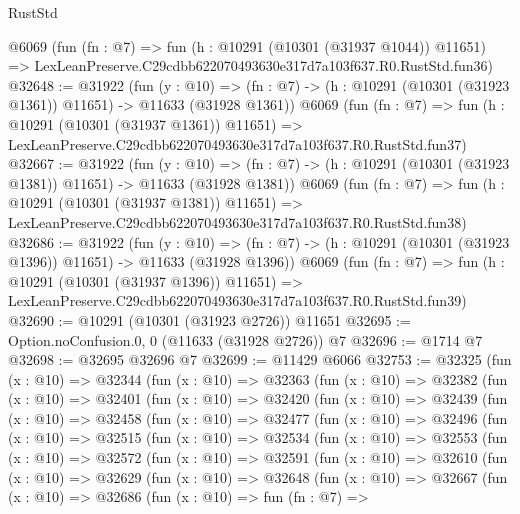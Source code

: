 \begin{lexlean}{RustStd}
\begin{coremodule}
    @6069
    (fun (fn : @7) =>
    fun (h : @10291 (@10301 (@31937 @1044)) @11651) =>
    LexLeanPreserve.C29cdbb622070493630e317d7a103f637.R0.RustStd.fun36)
@32648 := @31922
    (fun (y : @10) =>
    (fn : @7) -> (h : @10291 (@10301 (@31923 @1361)) @11651) -> @11633 (@31928 @1361))
    @6069
    (fun (fn : @7) =>
    fun (h : @10291 (@10301 (@31937 @1361)) @11651) =>
    LexLeanPreserve.C29cdbb622070493630e317d7a103f637.R0.RustStd.fun37)
@32667 := @31922
    (fun (y : @10) =>
    (fn : @7) -> (h : @10291 (@10301 (@31923 @1381)) @11651) -> @11633 (@31928 @1381))
    @6069
    (fun (fn : @7) =>
    fun (h : @10291 (@10301 (@31937 @1381)) @11651) =>
    LexLeanPreserve.C29cdbb622070493630e317d7a103f637.R0.RustStd.fun38)
@32686 := @31922
    (fun (y : @10) =>
    (fn : @7) -> (h : @10291 (@10301 (@31923 @1396)) @11651) -> @11633 (@31928 @1396))
    @6069
    (fun (fn : @7) =>
    fun (h : @10291 (@10301 (@31937 @1396)) @11651) =>
    LexLeanPreserve.C29cdbb622070493630e317d7a103f637.R0.RustStd.fun39)
@32690 := @10291 (@10301 (@31923 @2726)) @11651
@32695 := Option.noConfusion.{0, 0} (@11633 (@31928 @2726)) @7
@32696 := @1714 @7
@32698 := @32695 @32696 @7
@32699 := @11429 @6066
@32753 := @32325
    (fun (x : @10) =>
    @32344
      (fun (x : @10) =>
      @32363
        (fun (x : @10) =>
        @32382
          (fun (x : @10) =>
          @32401
            (fun (x : @10) =>
            @32420
              (fun (x : @10) =>
              @32439
                (fun (x : @10) =>
                @32458
                  (fun (x : @10) =>
                  @32477
                    (fun (x : @10) =>
                    @32496
                      (fun (x : @10) =>
                      @32515
                        (fun (x : @10) =>
                        @32534
                          (fun (x : @10) =>
                          @32553
                            (fun (x : @10) =>
                            @32572
                              (fun (x : @10) =>
                              @32591
                                (fun (x : @10) =>
                                @32610
                                  (fun (x : @10) =>
                                  @32629
                                    (fun (x : @10) =>
                                    @32648
                                      (fun (x : @10) =>
                                      @32667
                                        (fun (x : @10) =>
                                        @32686
                                          (fun (x : @10) =>
                                          fun (fn : @7) =>

\end{coremodule}
\end{lexlean}
